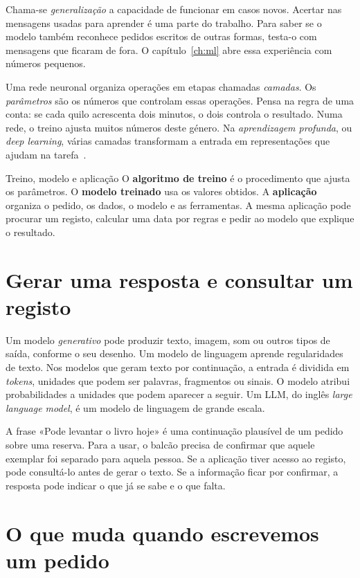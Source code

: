 Chama-se \emph{generalização} a capacidade de funcionar em casos novos. Acertar nas mensagens usadas para aprender é uma parte do trabalho. Para saber se o modelo também reconhece pedidos escritos de outras formas, testa-o com mensagens que ficaram de fora. O capítulo~\ref{ch:ml} abre essa experiência com números pequenos.

Uma rede neuronal organiza operações em etapas chamadas \emph{camadas}. Os \emph{parâmetros} são os números que controlam essas operações. Pensa na regra de uma conta: se cada quilo acrescenta dois minutos, o dois controla o resultado. Numa rede, o treino ajusta muitos números deste género. Na \emph{aprendizagem profunda}, ou \emph{deep learning}, várias camadas transformam a entrada em representações que ajudam na tarefa~\citep{goodfellow2016}.

\begin{keyideabox}{Treino, modelo e aplicação}
O \textbf{algoritmo de treino} é o procedimento que ajusta os parâmetros. O \textbf{modelo treinado} usa os valores obtidos. A \textbf{aplicação} organiza o pedido, os dados, o modelo e as ferramentas. A mesma aplicação pode procurar um registo, calcular uma data por regras e pedir ao modelo que explique o resultado.
\end{keyideabox}

\section{Gerar uma resposta e consultar um registo}

Um modelo \emph{generativo} pode produzir texto, imagem, som ou outros tipos de saída, conforme o seu desenho. Um modelo de linguagem aprende regularidades de texto. Nos modelos que geram texto por continuação, a entrada é dividida em \emph{tokens}, unidades que podem ser palavras, fragmentos ou sinais. O modelo atribui probabilidades a unidades que podem aparecer a seguir. Um LLM, do inglês \emph{large language model}, é um modelo de linguagem de grande escala.

A frase «Pode levantar o livro hoje» é uma continuação plausível de um pedido sobre uma reserva. Para a usar, o balcão precisa de confirmar que aquele exemplar foi separado para aquela pessoa. Se a aplicação tiver acesso ao registo, pode consultá-lo antes de gerar o texto. Se a informação ficar por confirmar, a resposta pode indicar o que já se sabe e o que falta.

\section{O que muda quando escrevemos um pedido}

